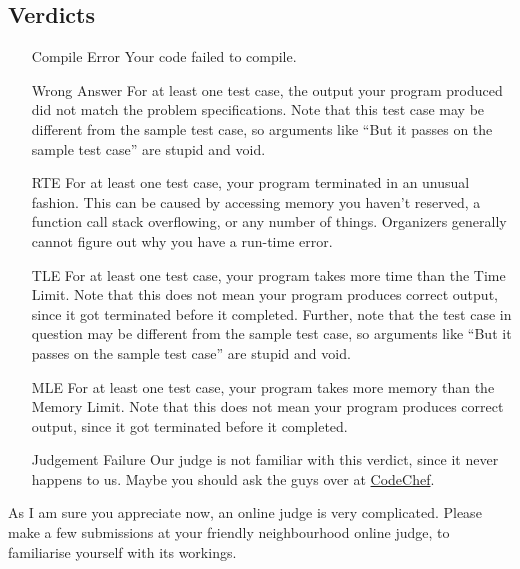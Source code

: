     \subsection{Verdicts}
        \begin{itemize}
            \item[Compile Error]
                Your code failed to compile.
            \item[Wrong Answer]
                For at least one test case, the output your program produced did not match the problem specifications. Note that this test case may be different from the sample test case, so arguments like ``But it passes on the sample test case'' are stupid and void.
            \item[RTE]
                For at least one test case, your program terminated in an unusual fashion. This can be caused by accessing memory you haven't reserved, a function call stack overflowing, or any number of things. Organizers generally cannot figure out why you have a run-time error.
            \item[TLE]
                For at least one test case, your program takes more time than the Time Limit. Note that this does not mean your program produces correct output, since it got terminated before it completed. Further, note that the test case in question may be different from the sample test case, so arguments like ``But it passes on the sample test case'' are stupid and void.
            \item[MLE]
                For at least one test case, your program takes more memory than the Memory Limit. Note that this does not mean your program produces correct output, since it got terminated before it completed.
            \item[Judgement Failure]
				Our judge is not familiar with this verdict, since it never happens to us. Maybe you should ask the guys over at \textcolor{blue}{\href{https://www.codechef.com}{CodeChef}}.
        \end{itemize}
    As I am sure you appreciate now, an online judge is very complicated. Please make a few submissions at your friendly neighbourhood online judge, to familiarise yourself with its workings.
